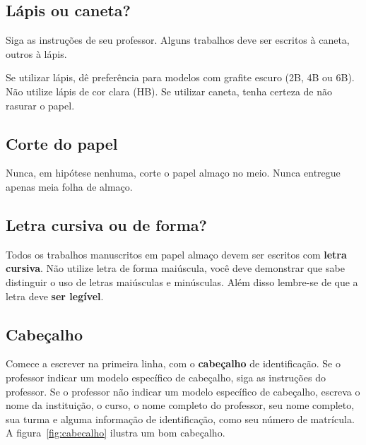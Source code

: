 \subsection{Lápis ou caneta?}
\label{sec:como-lapis}

Siga as instruções de seu professor. Alguns trabalhos deve ser escritos à
caneta, outros à lápis.

Se utilizar lápis, dê preferência para modelos com grafite escuro (2B, 4B ou
6B). Não utilize lápis de cor clara (HB). Se utilizar caneta, tenha certeza de
não rasurar o papel.


\subsection{Corte do papel}
\label{sec:como-corte}

Nunca, em hipótese nenhuma, corte o papel almaço no meio. Nunca entregue apenas
meia folha de almaço.


\subsection{Letra cursiva ou de forma?}
\label{sec:como-cursiva}

Todos os trabalhos manuscritos em papel almaço devem ser escritos com
\textbf{letra cursiva}. Não utilize letra de forma maiúscula, você deve
demonstrar que sabe distinguir o uso de letras maiúsculas e minúsculas. Além
disso lembre-se de que a letra deve \textbf{ser legível}.



\subsection{Cabeçalho}
\label{sec:como-cabecalho}

Comece a escrever na primeira linha, com o \textbf{cabeçalho} de
identificação. Se o professor indicar um modelo específico de cabeçalho, siga as
instruções do professor. Se o professor não indicar um modelo específico de
cabeçalho, escreva o nome da instituição, o curso, o nome completo do professor,
seu nome completo, sua turma e alguma informação de identificação, como seu
número de matrícula. A figura~\ref{fig:cabecalho} ilustra um bom cabeçalho.

